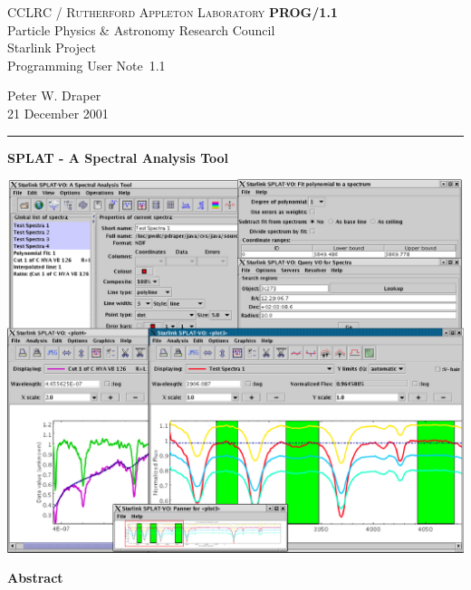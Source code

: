 \documentclass[twoside,11pt]{article}
\newcommand{\stardoccategory}  {Programming User Note}
\newcommand{\stardocinitials}  {PROG}
\newcommand{\stardocnumber}    {1.1}
\newcommand{\stardocauthors}   {Peter W. Draper}
\newcommand{\stardocdate}      {21 December 2001}
\newcommand{\stardoctitle}     {SPLAT - A Spectral Analysis Tool}
\newcommand{\stardocname}{\stardocinitials /\stardocnumber}
\newenvironment{latexonly}{}{}
\renewcommand{\_}{\texttt{\symbol{95}}}
\begin{document}
\thispagestyle{empty}

\begin{latexonly}
   CCLRC / \textsc{Rutherford Appleton Laboratory} \hfill \textbf{\stardocname}\\
   {\large Particle Physics \& Astronomy Research Council}\\
   {\large Starlink Project\\}
   {\large \stardoccategory\ \stardocnumber}
   \begin{flushright}
   \stardocauthors\\
   \stardocdate
   \end{flushright}
   \vspace{-4mm}
   \rule{\textwidth}{0.5mm}
   \vspace{5mm}
   \begin{center}
      {\LARGE\textbf{\stardoctitle \\ [2.5ex]}}
   \end{center}
   \vspace{5mm}

\begin{center}
\includegraphics[scale=0.6]{sun243_figures/frontfigure.eps}
\end{center}

   \begin{center}
      {\Large\textbf{Abstract}}
   \end{center}
\end{latexonly}
\end{document}
